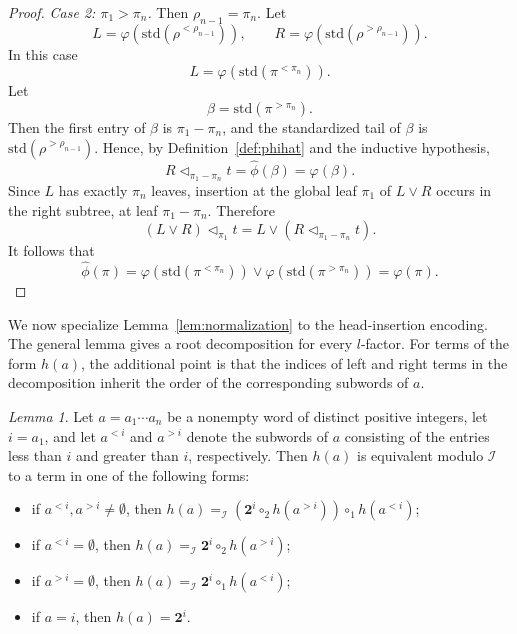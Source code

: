 \documentclass[a4paper]{article}
\theoremstyle{plain}
\theoremstyle{definition}
\theoremstyle{remark}
\numberwithin{equation}{section}
\newcommand{\std}{\mathrm{std}}
\newtheorem{lemma}[theorem]{Lemma}
\begin{document}
\begin{proof}
\medskip
\noindent\emph{Case 2: \(\pi_1>\pi_n\).}
Then \(\rho_{n-1}=\pi_n\). Let
\[
L=\varphi(\std(\rho^{<\rho_{n-1}})),
\qquad
R=\varphi(\std(\rho^{>\rho_{n-1}})).
\]
In this case
\[
L=\varphi(\std(\pi^{<\pi_n})).
\]
Let
\[
\beta=\std(\pi^{>\pi_n}).
\]
Then the first entry of \(\beta\) is \(\pi_1-\pi_n\), and the standardized tail
of \(\beta\) is \(\std(\rho^{>\rho_{n-1}})\). Hence, by
Definition~\ref{def:phihat} and the inductive hypothesis,
\[
R\triangleleft_{\pi_1-\pi_n}t
=
\widehat\phi(\beta)
=
\varphi(\beta).
\]
Since \(L\) has exactly \(\pi_n\) leaves, insertion at the global leaf
\(\pi_1\) of \(L\vee R\) occurs in the right subtree, at leaf
\(\pi_1-\pi_n\). Therefore
\[
(L\vee R)\triangleleft_{\pi_1}t
=
L\vee(R\triangleleft_{\pi_1-\pi_n}t).
\]
It follows that
\[
\widehat\phi(\pi)
=
\varphi(\std(\pi^{<\pi_n}))\vee
\varphi(\std(\pi^{>\pi_n}))
=
\varphi(\pi).
\]
\end{proof}

We now specialize Lemma~\ref{lem:normalization} to the head-insertion
encoding. The general lemma gives a root decomposition for every \(l\)-factor.
For terms of the form \(h(a)\), the additional point is that the indices of left and right terms in the decomposition
inherit the order of the corresponding subwords of \(a\).

\begin{lemma}\label{lem:h-word-decomposition}
Let \(a=a_1\cdots a_n\) be a nonempty word of distinct positive integers, let
\(i=a_1\), and let \(a^{<i}\) and \(a^{>i}\) denote the subwords of \(a\)
consisting of the entries less than \(i\) and greater than \(i\), respectively.
Then $h(a)$ is equivalent modulo ${\mathcal I}$ to a term in one of the following forms:
\begin{itemize}
    \item [$\cdot$] if \(a^{<i}, a^{>i}\neq\emptyset\), then $h(a)=_{\mathcal I}(\mathbf 2^i\circ_2 h(a^{>i}))\circ_1 h(a^{<i})$;
    \item [$\cdot$] if \(a^{<i}=\emptyset\), then $h(a)=_{\mathcal I}\mathbf 2^i\circ_2 h(a^{>i})$;
    \item [$\cdot$] if \(a^{>i}=\emptyset\), then $h(a)=_{\mathcal I}\mathbf 2^i\circ_1 h(a^{<i})$;
    \item [$\cdot$] if \(a=i\), then $h(a)=\mathbf 2^i$.
\end{itemize}
\end{lemma}
\end{document}
